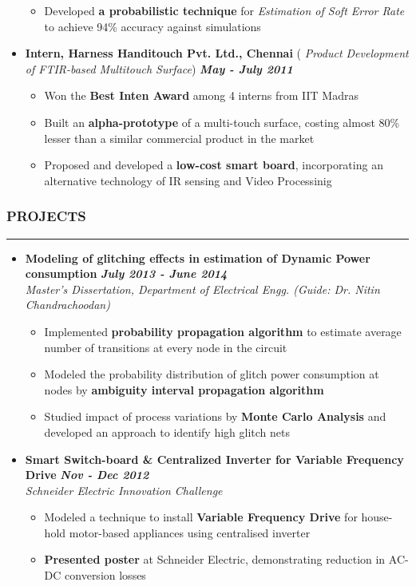 \documentclass[10pt,a4paper,English]{article}
\newcommand\roottitle[1]{\vspace{-4mm}\subsubsection*{\uppercase{#1}}\vspace{-0.3em}\nopagebreak[4]\hrule}
\newcommand\itemyear[1]{\hfill \textbf{\emph{\color{itemyear} #1}}}
\newcommand\itemenv{\setlength\itemsep{0.5pt} \addtolength{\itemindent}{-5mm}\vspace{-1.5mm}}
\begin{document}
\begin{itemize}
\begin{itemize}
            \item Developed \textbf{a probabilistic technique} for \emph{Estimation of Soft Error Rate} to achieve 94\% accuracy against simulations
        \end{itemize}
    \item \textbf{ Intern, Harness Handitouch Pvt. Ltd., Chennai } \hfill({\emph{ Product Development of FTIR-based Multitouch Surface}}) \itemyear{May - July 2011}
        \begin{itemize} \itemenv
            \item Won the \textbf{Best Inten Award} among 4 interns from IIT Madras
            \item Built an \textbf{alpha-prototype} of a multi-touch surface, costing almost 80\% lesser than a similar commercial product in the market
            \item Proposed and developed a \textbf{low-cost smart board}, incorporating an alternative technology of IR sensing and Video Processinig
        \end{itemize}
  \end{itemize}

\roottitle{Projects}
\vspace{4mm}
\begin{itemize} \itemenv
    \item \textbf{Modeling of glitching effects in estimation of Dynamic Power consumption} \hfill \itemyear{July 2013 - June 2014} \\
    \emph{Master's Dissertation, Department of Electrical Engg. (Guide: Dr. Nitin Chandrachoodan)}
        \begin{itemize} \itemenv
            \item Implemented \textbf{probability propagation algorithm} to estimate average number of transitions at every node in the circuit
            \item Modeled the probability distribution of glitch power consumption at nodes by \textbf{ambiguity interval propagation algorithm}
            \item Studied impact of process variations by \textbf{Monte Carlo Analysis} and developed an approach to identify high glitch nets
        \end{itemize}
    \item \textbf{ Smart Switch-board \& Centralized Inverter for Variable Frequency Drive } \hfill \itemyear{Nov - Dec 2012} \\
    \emph{Schneider Electric Innovation Challenge} 
        \begin{itemize} \itemenv
            \item Modeled a technique to install \textbf{Variable Frequency Drive} for house-hold motor-based appliances using centralised inverter 
            \item \textbf{Presented poster} at Schneider Electric, demonstrating reduction in AC-DC conversion losses 
        \end{itemize}
\end{itemize}
\end{document}
